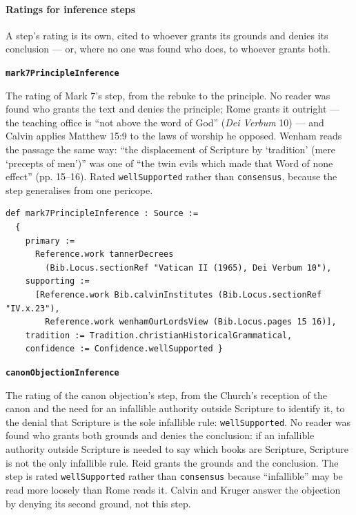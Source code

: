 \documentclass[11pt]{article}
\begin{document}
\paragraph*{Ratings for inference steps}
\leavevmode\par\nobreak
A step’s rating is its own, cited to whoever grants its grounds and denies its conclusion — or, where no one was found who does, to whoever grants both.

\par\medskip\noindent\textbf{\texttt{mark7\allowbreak{}Principle\allowbreak{}Inference}}\par\nobreak\noindent
The rating of Mark 7’s step, from the rebuke to the principle. No reader was found who grants the text and denies the principle; Rome grants it outright — the teaching office is “not above the word of God” (\emph{Dei Verbum} 10) — and Calvin applies Matthew 15:9 to the laws of worship he opposed. Wenham reads the passage the same way: “the displacement of Scripture by ‘tradition’ (mere ‘precepts of men’)” was one of “the twin evils which made that Word of none effect” (pp. 15–16). Rated \texttt{well\allowbreak{}Supported} rather than \texttt{consensus}, because the step generalises from one pericope.

{\small\begin{verbatim}
def mark7PrincipleInference : Source :=
  {
    primary :=
      Reference.work tannerDecrees
        (Bib.Locus.sectionRef "Vatican II (1965), Dei Verbum 10"),
    supporting :=
      [Reference.work Bib.calvinInstitutes (Bib.Locus.sectionRef "IV.x.23"),
        Reference.work wenhamOurLordsView (Bib.Locus.pages 15 16)],
    tradition := Tradition.christianHistoricalGrammatical,
    confidence := Confidence.wellSupported }
\end{verbatim}}
\par\medskip\noindent\textbf{\texttt{canon\allowbreak{}Objection\allowbreak{}Inference}}\par\nobreak\noindent
The rating of the canon objection’s step, from the Church’s reception of the canon and the need for an infallible authority outside Scripture to identify it, to the denial that Scripture is the sole infallible rule: \texttt{well\allowbreak{}Supported}. No reader was found who grants both grounds and denies the conclusion: if an infallible authority outside Scripture is needed to say which books are Scripture, Scripture is not the only infallible rule. Reid grants the grounds and the conclusion. The step is rated \texttt{well\allowbreak{}Supported} rather than \texttt{consensus} because “infallible” may be read more loosely than Rome reads it. Calvin and Kruger answer the objection by denying its second ground, not this step.
\end{document}
